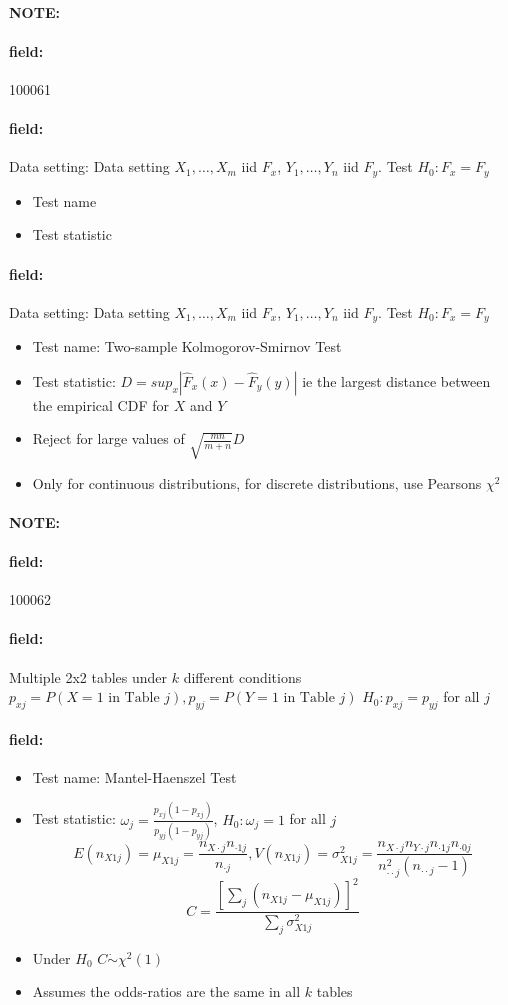 \documentclass[12pt]{article}
\newenvironment{note}{\paragraph{NOTE:}}{}
\newenvironment{field}{\paragraph{field:}}{}
\begin{document}
\begin{note} \begin{field} \tiny 100061 \end{field}
 \begin{field}
  Data setting: Data setting $X_1, \ldots , X_m$ iid $F_x$, $Y_1, \ldots, Y_n$ iid $F_y$. Test $H_0: F_x = F_y$
  \begin{itemize}
   \item Test name
   \item Test statistic

  \end{itemize}
 \end{field}
 \begin{field}
  Data setting: Data setting $X_1, \ldots , X_m$ iid $F_x$, $Y_1, \ldots, Y_n$ iid $F_y$. Test $H_0: F_x = F_y$
  \begin{itemize}
   \item Test name: Two-sample Kolmogorov-Smirnov Test
   \item Test statistic: $D = sup_x|\hat{F}_x(x) - \hat{F}_y(y)|$ ie the largest distance between the empirical CDF for $X$ and $Y$
   \item Reject for large values of $\sqrt{\frac{mn}{m+n}} D$
   \item Only for continuous distributions, for discrete distributions, use Pearsons $\chi^2$
  \end{itemize}
 \end{field}
\end{note}

\begin{note} \begin{field} \tiny 100062 \end{field}
 \begin{field}
  Multiple 2x2 tables under $k$ different conditions $p_{xj} = P(X = 1 \text{ in Table }j), p_{yj} = P(Y = 1 \text{ in Table }j)$ $H_0: p_{xj} = p_{yj}$ for all $j$
 \end{field}

 \begin{field}
  \begin{itemize}
   \item Test name: Mantel-Haenszel Test
   \item Test statistic: $\omega_j = \frac{p_{xj}(1 - p_{xj})}{p_{yj}(1 - p_{yj})}$, $H_0: \omega_j = 1$ for all $j$
         $$E(n_{X1j}) = \mu_{X1j} = \frac{n_{X\cdot j}n_{\cdot 1 j}}{n_{\cdot j}}, V(n_{X1j}) = \sigma^2_{X1j} = \frac{n_{X\cdot j}n_{Y\cdot j}n_{\cdot 1j} n_{\cdot 0j}}{n^2_{\cdot \cdot j}(n_{\cdot \cdot j} -1)} $$
         $$ C = \frac{[\sum_{j}(n_{X1j} - \mu_{X1j})]^2}{\sum_j \sigma^2_{X1j}}$$
   \item Under $H_0$ $C \dot\sim \chi^2(1)$
   \item Assumes the odds-ratios are the same in all $k$ tables
  \end{itemize}
 \end{field}
\end{note}
\end{document}
